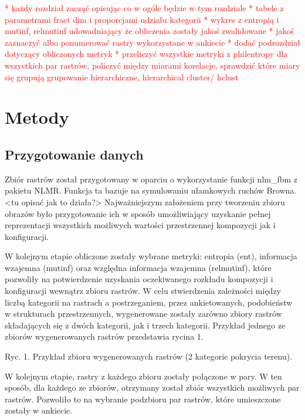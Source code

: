 \documentclass{amuthesis}
\begin{document}
\textcolor{red}{
* każdy rozdział zacząć opisując co w ogóle będzie w tym rozdziale
* tabele z parametrami fract dim i proporcjami udziału kategorii
* wykres z entropią i mutinf, relmutinf udowadniający że obliczenia zostały jakoś zwalidowane
* jakoś zaznaczyć albo ponumerować rastry wykorzystane w ankiecie
* dodać podrozdział dotyczący obliczonych metryk
* przeliczyć wszystkie metryki z philentropy dla wszystkich par rastrów, policzyć między miarami korelacje, sprawdzić które miary się grupują grupowanie hierarchiczne, hierarchical cluster/ hclust
}


\hypertarget{sec-metody}{%
\chapter{Metody}\label{sec-metody}}

\hypertarget{sec-przyg-danych}{%
\section{Przygotowanie danych}\label{sec-przyg-danych}}

Zbiór rastrów został przygotowany w oparciu o wykorzystanie funkcji
nlm\_fbm z pakietu NLMR. Funkcja ta bazuje na symulowaniu ułamkowych
ruchów Browna. \textless tu opisać jak to działa?\textgreater{}
Najważniejszym założeniem przy tworzeniu zbioru obrazów było
przygotowanie ich w sposób umożliwiający uzyskanie pełnej reprezentacji
wszystkich możliwych wartości przestrzennej kompozycji jak i
konfiguracji.

W kolejnym etapie obliczone zostały wybrane metryki: entropia (ent),
informacja wzajemna (mutinf) oraz względna informacja wzajemna
(relmutinf), które pozwoliły na potwierdzenie uzyskania oczekiwanego
rozkładu kompozycji i konfiguracji wewnątrz zbioru rastrów. W celu
stwierdzenia zależności między liczbą kategorii na rastrach a
postrzeganiem, przez ankietowanych, podobieństw w strukturach
przestrzennych, wygenerowane zostały zarówno zbiory rastrów składających
się z dwóch kategorii, jak i trzech kategorii. Przykład jednego ze
zbiorów wygenerowanych rastrów przedstawia rycina 1.

Ryc. 1. Przykład zbioru wygenerowanych rastrów (2 kategorie pokrycia
terenu).

W kolejnym etapie, rastry z każdego zbioru zostały połączone w pary. W
ten sposób, dla każdego ze zbiorów, otrzymany został zbiór wszystkich
możliwych par rastrów. Pozwoliło to na wybranie podzbioru par rastrów,
które umieszczone zostały w ankiecie.
\end{document}
